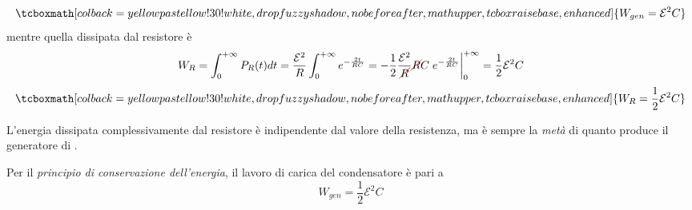 \begin{equation}
	\tcboxmath[colback=yellowpastellow!30!white,drop fuzzy shadow, nobeforeafter, math upper, tcbox raise base, enhanced]{W_{gen}=\mathcal{E}^2C}
\end{equation}
mentre quella dissipata dal resistore è
\begin{equation*}
	W_{R}=\int_{0}^{+\infty}P_{R}(t)dt=\frac{\mathcal{E}^2}{R}\int_{0}^{+\infty}e^{-\frac{2t}{RC}}=-\frac{1}{2}\frac{\mathcal{E}^2}{\Ccancel[red]{R}}\Ccancel[red]{R}C\eval{e^{-\frac{2t}{RC}}}_{0}^{+\infty}=\frac{1}{2}\mathcal{E}^2C
\end{equation*}
\begin{equation}
	\tcboxmath[colback=yellowpastellow!30!white,drop fuzzy shadow, nobeforeafter, math upper, tcbox raise base, enhanced]{W_{R}=\frac{1}{2}\mathcal{E}^2C}
\end{equation}
\begin{observe}
	L'energia dissipata complessivamente dal resistore è indipendente dal valore della resistenza, ma è sempre la \textit{metà} di quanto produce il generatore di \fem.
\end{observe}
Per il \textit{principio di conservazione dell'energia}, il lavoro di carica del condensatore è pari a 
\begin{equation}
	W_{gen}=\frac{1}{2}\mathcal{E}^2C
\end{equation}
